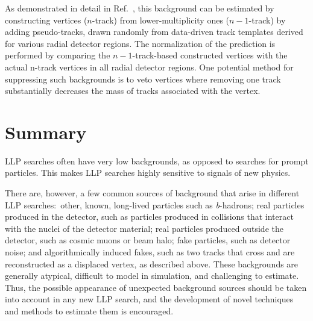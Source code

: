 As demonstrated in detail in Ref.~\cite{Aaboud:2017iio,Aad:2015rba}, this background can be estimated by constructing vertices ($n$-track) from lower-multiplicity ones ($n-1$-track) by adding pseudo-tracks, drawn randomly from data-driven track templates derived for various radial detector regions. The normalization of the prediction is performed by comparing the $n-1$-track-based constructed vertices with the actual n-track vertices in all radial detector regions. One potential method for suppressing such backgrounds is to veto vertices where removing one track substantially decreases the mass of tracks associated with the vertex.

\section{Summary} %

LLP searches often have very low backgrounds, as opposed to searches for prompt particles. This makes LLP searches highly sensitive to signals of new physics.

There are, however, a few common sources of background that arise in different LLP searches:~other, known, long-lived particles such as \textit{b}-hadrons; real particles produced in the detector, such as particles produced in collisions that interact with the nuclei of the detector material; real particles produced outside the detector, such as cosmic muons or beam halo; fake particles, such as detector noise; and algorithmically induced fakes, such as two tracks that cross and are reconstructed as a displaced vertex, as described above. These backgrounds are generally atypical, difficult to model in simulation, and challenging to estimate. Thus, the possible appearance of unexpected background sources should be taken into account in any new LLP search, and the development of novel techniques and methods to estimate them is encouraged.
